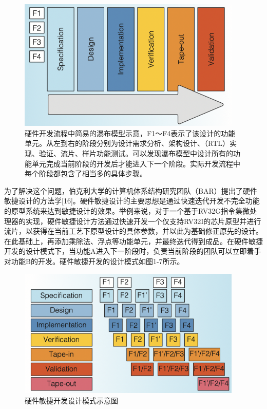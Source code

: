 \begin{figure}[htbp]
	\centering
	\includegraphics[width=0.95\textwidth]{Photos/waterfall.png}
	\caption{硬件开发流程中简易的瀑布模型示意，F1～F4表示了该设计的功能单元。从左到右的阶段分别为设计需求分析、架构设计、（RTL）实现、验证、流片、样片功能测试。可以发现瀑布模型中设计所有的功能单元完成当前阶段的开发后才能进入下一个阶段。实际开发流程中每个阶段都包含了相当多的具体步骤。}
\end{figure}

为了解决这个问题，伯克利大学的计算机体系结构研究团队（BAR）提出了硬件敏捷设计的方法学[16]。硬件敏捷设计的主要思想是通过快速迭代开发不完全功能的原型系统来达到敏捷设计的效果。举例来说，对于一个基于RV32G指令集微处理器的实现，硬件敏捷设计方法通过快速开发一个仅支持RV32I的芯片原型并进行流片，以获得在当前工艺下原型设计的具体参数，并以此为基础修正原先的设计。在此基础上，再添加乘除法、浮点等功能单元，并最终迭代得到成品。在硬件敏捷开发的设计模式下，当功能A进入下一阶段时，负责当前阶段的团队可以立即着手对功能B的开发。硬件敏捷开发的设计模式如图1-7所示。

\begin{figure}[htbp]
	\centering
	\includegraphics[width=0.95\textwidth]{Photos/agile_hardware_dev.png}
	\caption{硬件敏捷开发设计模式示意图}
\end{figure}

